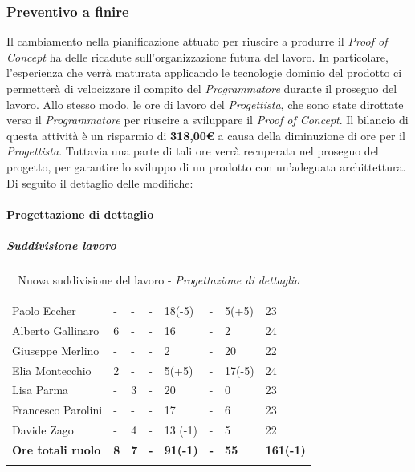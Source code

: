 \subsubsection{Preventivo a finire}
Il cambiamento nella pianificazione attuato per riuscire a produrre il \textit{Proof of Concept} ha delle ricadute sull'organizzazione futura del lavoro. In particolare, l'esperienza che verrà maturata applicando le tecnologie dominio del prodotto ci permetterà di velocizzare il compito del \textit{Programmatore} durante il proseguo del lavoro. Allo stesso modo, le ore di lavoro del \textit{Progettista}, che sono state dirottate verso il \textit{Programmatore} per riuscire a sviluppare il \textit{Proof of Concept}. Il bilancio di questa attività è un risparmio di \textbf{318,00\euro} a causa della diminuzione di ore per il \textit{Progettista}. Tuttavia una parte di tali ore verrà recuperata nel proseguo del progetto, per garantire lo sviluppo di un prodotto con un'adeguata archittettura.
Di seguito il dettaglio delle modifiche:


\paragraph{Progettazione di dettaglio}
	\subparagraph{Suddivisione lavoro}\Spazio
	\begin{table}[H]
	\centering
	\begin{tabular}{|C{4.5cm}|C{1cm}|C{1cm}|C{1cm}|C{1cm}|C{1cm}|C{1cm}|C{3cm}|}
		 & & &&&&&\\
		Paolo Eccher      & - & - & - & 18(-5) & - & 5(+5) & 23 \\
		\hline
		Alberto Gallinaro & 6 & - & - & 16 & - & 2 & 24 \\
		\hline
		Giuseppe Merlino  & - & - & - & 2 & - & 20 & 22 \\
		\hline
		Elia Montecchio   & 2 & - & - & 5(+5) & - & 17(-5) & 24 \\
		\hline
		Lisa Parma        & - & 3 & - & 20 & - & 0 & 23 \\
		\hline
		Francesco Parolini& - & - & - & 17 & - & 6 & 23 \\
		\hline
		Davide Zago       & - & 4 & - & 13 (-1) & - & 5 & 22 \\
		\hline
		\textbf{Ore totali ruolo}  & \textbf{8} & \textbf{7} & \textbf{-} & \textbf{91(-1)} & \textbf{-} & \textbf{55} & \textbf{161(-1)} \\
	\end{tabular}
	\caption{Nuova suddivisione del lavoro - \textit{Progettazione di dettaglio}}
\end{table}

